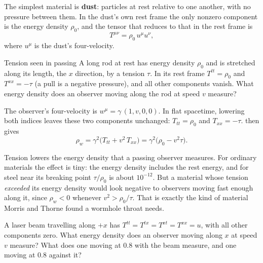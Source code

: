 The simplest material is \textbf{dust}: particles at rest relative to one
another, with no pressure between them. In the dust's own rest frame the only
nonzero component is the energy density $\rho_{0}$, and the tensor that
reduces to that in the rest frame is
\begin{equation}
  T^{\mu\nu} = \rho_{0}\,u^{\mu}u^{\nu},
  \label{eq:dust}
\end{equation}
where $u^{\mu}$ is the dust's four-velocity.

\begin{example}[label=ex:tension-passing]{Tension seen in passing}
A long rod at rest has energy density $\rho_{0}$ and is stretched along its
length, the $x$ direction, by a tension $\tau$. In its rest frame
$T^{tt} = \rho_{0}$ and $T^{xx} = -\tau$ (a pull is a negative pressure), and
all other components vanish. What energy density does an observer moving
along the rod at speed $v$ measure?

\solution The observer's four-velocity is $w^{\mu} = \gamma\,(1, v, 0, 0)$. In
flat spacetime, lowering both indices leaves these two components unchanged:
$T_{tt} = \rho_{0}$ and $T_{xx} = -\tau$.  then gives
\begin{equation*}
  \rho_{w} = \gamma^{2}\bigl(T_{tt} + v^{2}\,T_{xx}\bigr)
  = \gamma^{2}\bigl(\rho_{0} - v^{2}\tau\bigr).
\end{equation*}

\discussion Tension lowers the energy density that a passing observer
measures. For ordinary materials the effect is tiny: the energy density
includes the rest energy, and for steel near its breaking point $\tau/\rho_{0}$
is about $10^{-12}$. But a material whose tension \emph{exceeded} its energy
density would look negative to observers moving fast enough along it, since
$\rho_{w} < 0$ whenever $v^{2} > \rho_{0}/\tau$. That is exactly the kind of
material Morris and Thorne found a wormhole throat needs.
\end{example}

\begin{checkpoint}[label=chk:laser]
A laser beam travelling along $+x$ has $T^{tt} = T^{tx} = T^{xt} = T^{xx} = u$,
with all other components zero. What energy density does an observer moving
along $x$ at speed $v$ measure? What does one moving at $0.8$ with the beam
measure, and one moving at $0.8$ against it?
\end{checkpoint}

